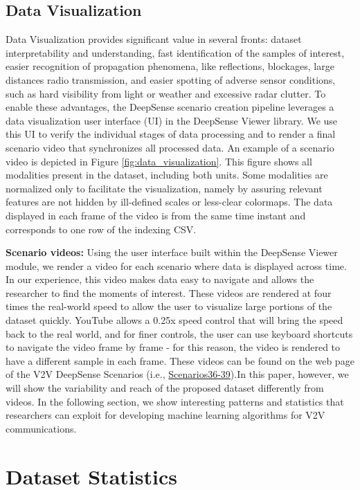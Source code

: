 \documentclass[10pt,comsoc]{IEEEtran}
\begin{document}
\subsection{Data Visualization} \label{subsec:Visualization}

Data Visualization provides significant value in several fronts: dataset interpretability and understanding, fast identification of the samples of interest, easier recognition of propagation phenomena, like reflections, blockages, large distances radio transmission, and easier spotting of adverse sensor conditions, such as hard visibility from light or weather and excessive radar clutter. To enable these advantages, the DeepSense scenario creation pipeline leverages a data visualization user interface (UI) in the DeepSense Viewer library. We use this UI to verify the individual stages of data processing and to render a final scenario video that synchronizes all processed data. An example of a scenario video is depicted in Figure \ref{fig:data_visualization}. This figure shows all modalities present in the dataset, including both units. Some modalities are normalized only to facilitate the visualization, namely by assuring relevant features are not hidden by ill-defined scales or less-clear colormaps. The data displayed in each frame of the video is from the same time instant and corresponds to one row of the indexing CSV. 

\textbf{Scenario videos:} Using the user interface built within the DeepSense Viewer module, we render a video for each scenario where data is displayed across time. In our experience, this video makes data easy to navigate and allows the researcher to find the moments of interest. These videos are rendered at four times the real-world speed to allow the user to visualize large portions of the dataset quickly. YouTube allows a 0.25x speed control that will bring the speed back to the real world, and for finer controls, the user can use keyboard shortcuts to navigate the video frame by frame - for this reason, the video is rendered to have a different sample in each frame. These videos can be found on the web page of the V2V DeepSense Scenarios (i.e., \href{https://deepsense6g.net/scenarios36-39/}{Scenarios36-39}).In this paper, however, we will show the variability and reach of the proposed dataset differently from videos. In the following section, we show interesting patterns and statistics that researchers can exploit for developing machine learning algorithms for V2V communications.

\section{Dataset Statistics} \label{sec:Statistics}
\end{document}
